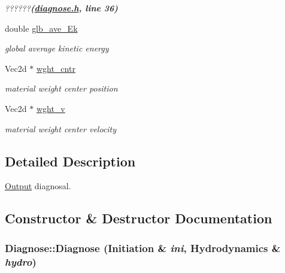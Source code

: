 \begin{CompactItemize}
\begin{CompactList}\small\item\em ??????{\bf (\hyperlink{diagnose_8h}{diagnose.h}, line 36)} \item\end{CompactList}\item 
\hypertarget{classDiagnose_1784f6a7677b271e8968147df019e8b0}{
double \hyperlink{classDiagnose_1784f6a7677b271e8968147df019e8b0}{glb\_\-ave\_\-Ek}}
\label{classDiagnose_1784f6a7677b271e8968147df019e8b0}

\begin{CompactList}\small\item\em global average kinetic energy \item\end{CompactList}\item 
\hypertarget{classDiagnose_52f9cc1859fecd569c05de78243e45bd}{
Vec2d $\ast$ \hyperlink{classDiagnose_52f9cc1859fecd569c05de78243e45bd}{wght\_\-cntr}}
\label{classDiagnose_52f9cc1859fecd569c05de78243e45bd}

\begin{CompactList}\small\item\em material weight center position \item\end{CompactList}\item 
\hypertarget{classDiagnose_8b02748469646274034f793aab57193b}{
Vec2d $\ast$ \hyperlink{classDiagnose_8b02748469646274034f793aab57193b}{wght\_\-v}}
\label{classDiagnose_8b02748469646274034f793aab57193b}

\begin{CompactList}\small\item\em material weight center velocity \item\end{CompactList}\end{CompactItemize}


\subsection{Detailed Description}
\hyperlink{classOutput}{Output} diagnosal. 

\subsection{Constructor \& Destructor Documentation}
\hypertarget{classDiagnose_915a3d571504c843748bf5e9a9ec801c}{
\subsubsection[{Diagnose}]{\setlength{\rightskip}{0pt plus 5cm}Diagnose::Diagnose ({\bf Initiation} \& {\em ini}, \/  {\bf Hydrodynamics} \& {\em hydro})}}
\label{classDiagnose_915a3d571504c843748bf5e9a9ec801c}


